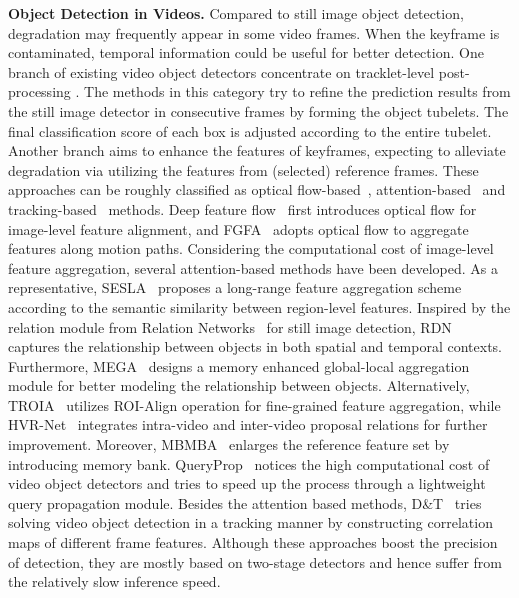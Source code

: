 \documentclass[letterpaper]{article} \usepackage{aaai23}  \usepackage{times}  \usepackage{helvet}  \usepackage{courier}  \usepackage[hyphens]{url}  \usepackage{graphicx} \urlstyle{rm} \def\UrlFont{\rm}  \usepackage{natbib}  \usepackage{caption} \usepackage{xcolor}
\begin{document}
\noindent
\textbf{Object Detection in Videos.} Compared to still image object detection, degradation may frequently appear in some video frames. When the keyframe is contaminated, temporal information could be useful for better detection. One branch of existing video object detectors concentrate on tracklet-level post-processing \cite{han2016seq,belhassen2019improving,sabater2020robust}. The methods in this category try to refine the prediction results from the still image detector in consecutive frames by forming the object tubelets. The final classification score of each box is  adjusted according to the entire tubelet. Another branch aims to enhance the features of keyframes, expecting to alleviate degradation via utilizing the features from (selected) reference frames. These approaches can be roughly classified as optical flow-based~\cite{zhu2017flow,zhu2018towards}, attention-based~\cite{wu2019sequence,deng2019relation,chen2020memory,gong2021temporal,sun2021mamba} and tracking-based~\cite{feichtenhofer2017detect,zhang2018integrated} methods. Deep feature flow~\cite{zhu2017deep} first introduces optical flow for image-level feature alignment, and FGFA~\cite{zhu2017flow} adopts optical flow to aggregate features along motion paths. Considering the computational cost of image-level feature aggregation, several attention-based methods have been developed. As a representative, SESLA~\cite{wu2019sequence} proposes a long-range feature aggregation scheme according to the semantic similarity between region-level features. Inspired by the relation module from Relation Networks~\cite{hu2018relation} for still image detection, RDN~\cite{deng2019relation} captures the relationship between objects in both spatial and temporal contexts. Furthermore, MEGA~\cite{chen2020memory} designs a memory enhanced global-local aggregation module for better modeling the relationship between objects. Alternatively, TROIA~\cite{gong2021temporal} utilizes ROI-Align operation for fine-grained feature aggregation, while HVR-Net~\cite{han2020mining} integrates intra-video and inter-video proposal relations for further improvement. Moreover, MBMBA~\cite{sun2021mamba} enlarges the reference feature set by introducing memory bank. QueryProp~\cite{he2022queryprop} notices the high computational cost of video object detectors and tries to speed up the process through a lightweight query propagation module. Besides the attention based methods, D\&T~\cite{feichtenhofer2017detect} tries solving video object detection in a tracking manner by constructing correlation maps of different frame features. Although these approaches boost the precision of detection, they are mostly based on two-stage detectors and hence suffer from the relatively slow inference speed. 
\end{document}
